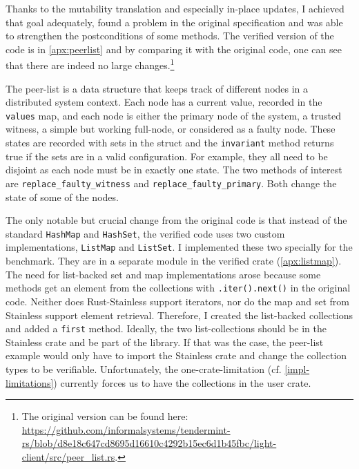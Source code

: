 Thanks to the mutability translation and especially in-place updates, I achieved
that goal adequately, found a problem in the original specification and was able
to strengthen the postconditions of some methods. The verified version of the
code is in \autoref{apx:peerlist} and by comparing it with the original code,
one can see that there are indeed no large changes.\footnote{The original
version can be found here:
\url{https://github.com/informalsystems/tendermint-rs/blob/d8e18c647cd8695d16610c4292b15ec6d1b45fbc/light-client/src/peer_list.rs}.}

The peer-list is a data structure that keeps track of different nodes in a
distributed system context. Each node has a current value, recorded in the
\lstinline!values! map, and each node is either the primary node of the system,
a trusted witness, a simple but working full-node, or considered as a faulty
node. These states are recorded with sets in the struct and the
\lstinline!invariant! method returns true if the sets are in a valid
configuration. For example, they all  need to be disjoint as each node must be
in exactly one state. The two methods of interest are
\lstinline!replace_faulty_witness! and \lstinline!replace_faulty_primary!.
Both change the state of some of the nodes.

The only notable but crucial change from the original code is that instead of
the standard \lstinline!HashMap! and \lstinline!HashSet!, the verified code uses
two custom implementations, \lstinline!ListMap! and \lstinline!ListSet!. I
implemented these two specially for the benchmark. They are in a separate module
in the verified crate (\autoref{apx:listmap}). The need for list-backed set and
map implementations arose because some methods get an element from the
collections with \lstinline!.iter().next()! in the original code. Neither does
Rust-Stainless support iterators, nor do the map and set from Stainless support
element retrieval. Therefore, I created the list-backed collections and added a
\lstinline!first! method. Ideally, the two list-collections should be in the
Stainless crate and be part of the library. If that was the case, the peer-list
example would only have to import the Stainless crate and change  the collection
types to be verifiable. Unfortunately, the one-crate-limitation (cf.
\autoref{impl-limitations}) currently forces us to have the collections in the
user crate.

